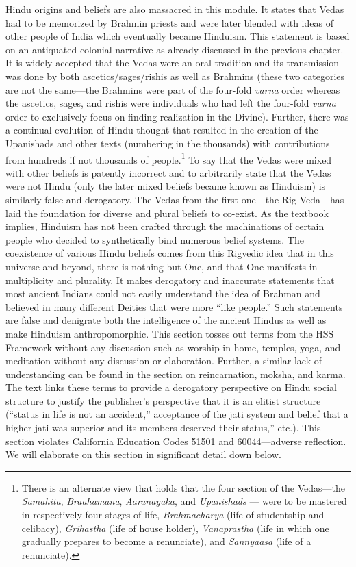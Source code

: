 Hindu origins and beliefs are also massacred in this module. It states that Vedas had to be memorized by Brahmin priests and were later blended with ideas of other people of India which eventually became Hinduism. This statement is based on an antiquated colonial narrative as already discussed in the previous chapter. It is widely accepted that the Vedas were an oral tradition and its transmission was done by both ascetics/sages/rishis as well as Brahmins (these two categories are not the same—the Brahmins were part of the four-fold \textit{varna}  order whereas the ascetics, sages, and rishis were individuals who had left the four-fold \textit{varna}  order to exclusively focus on finding realization in the Divine). Further, there was a continual evolution of Hindu thought that resulted in the creation of the Upanishads and other texts (numbering in the thousands) with contributions from hundreds if not thousands of people.\footnote{There is an alternate view that holds that the four section of the 	Vedas—the \textit{Samahita}, \textit{Braahamana}, \textit{Aaranayaka}, and \textit{Upanishads} — were to be mastered in respectively four stages of life, \textit{Brahmacharya} (life of studentship and celibacy), \textit{Grihastha} (life of house holder), \textit{Vanaprastha} (life in which one gradually prepares to become a renunciate), and \textit{Sannyaasa} (life of a renunciate).} To say that the Vedas were mixed with other beliefs is patently incorrect and to arbitrarily state that the Vedas were not Hindu (only the later mixed beliefs became known as Hinduism) is similarly false and derogatory. The Vedas from the first one—the Rig Veda—has laid the foundation for diverse and plural beliefs to co-exist. As the textbook implies, Hinduism has not been crafted through the machinations of certain people who decided to synthetically bind numerous belief systems. The coexistence of various Hindu beliefs comes from this Rigvedic idea that in this universe and beyond, there is nothing but One, and that One manifests in multiplicity and plurality. It makes derogatory and inaccurate statements that most ancient Indians could not easily understand the idea of Brahman and believed in many different Deities that were more “like people.” Such statements are false and denigrate both the intelligence of the ancient Hindus as well as make Hinduism anthropomorphic. This section tosses out terms from the HSS Framework without any discussion such as worship in home, temples, yoga, and meditation without any discussion or elaboration. Further, a similar lack of understanding can be found in the section on reincarnation, moksha, and karma. The text links these terms to provide a derogatory perspective on Hindu social structure to justify the publisher’s perspective that it is an elitist structure (“status in life is not an accident,” acceptance of the jati system and belief that a higher jati was superior and its members deserved their status,” etc.). This section violates California Education Codes 51501 and 60044—adverse reflection. We will elaborate on this section in significant detail down below.  

